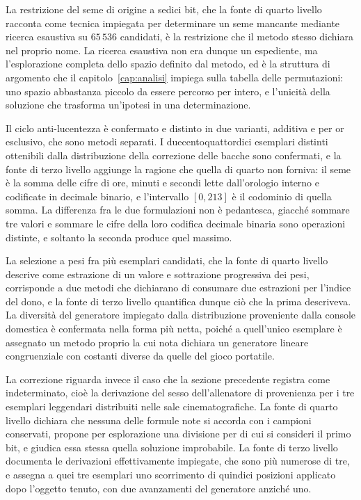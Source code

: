 La restrizione del seme di origine a sedici bit, che la fonte di quarto livello racconta come tecnica impiegata per determinare un seme mancante mediante ricerca esaustiva su $65\,536$ candidati, è la restrizione che il metodo stesso dichiara nel proprio nome. La ricerca esaustiva non era dunque un espediente, ma l'esplorazione completa dello spazio definito dal metodo, ed è la struttura di argomento che il capitolo~\ref{cap:analisi} impiega sulla tabella delle permutazioni: uno spazio abbastanza piccolo da essere percorso per intero, e l'unicità della soluzione che trasforma un'ipotesi in una determinazione.

Il ciclo anti-lucentezza è confermato e distinto in due varianti, additiva e per or esclusivo, che sono metodi separati. I duecentoquattordici esemplari distinti ottenibili dalla distribuzione della correzione delle bacche sono confermati, e la fonte di terzo livello aggiunge la ragione che quella di quarto non forniva: il seme è la somma delle cifre di ore, minuti e secondi lette dall'orologio interno e codificate in decimale binario, e l'intervallo $[0,213]$ è il codominio di quella somma. La differenza fra le due formulazioni non è pedantesca, giacché sommare tre valori e sommare le cifre della loro codifica decimale binaria sono operazioni distinte, e soltanto la seconda produce quel massimo.

La selezione a pesi fra più esemplari candidati, che la fonte di quarto livello descrive come estrazione di un valore e sottrazione progressiva dei pesi, corrisponde a due metodi che dichiarano di consumare due estrazioni per l'indice del dono, e la fonte di terzo livello quantifica dunque ciò che la prima descriveva. La diversità del generatore impiegato dalla distribuzione proveniente dalla console domestica è confermata nella forma più netta, poiché a quell'unico esemplare è assegnato un metodo proprio la cui nota dichiara un generatore lineare congruenziale con costanti diverse da quelle del gioco portatile.

La correzione riguarda invece il caso che la sezione precedente registra come indeterminato, cioè la derivazione del sesso dell'allenatore di provenienza per i tre esemplari leggendari distribuiti nelle sale cinematografiche. La fonte di quarto livello dichiara che nessuna delle formule note si accorda con i campioni conservati, propone per esplorazione una divisione per  di cui si consideri il primo bit, e giudica essa stessa quella soluzione improbabile. La fonte di terzo livello documenta le derivazioni effettivamente impiegate, che sono più numerose di tre, e assegna a quei tre esemplari uno scorrimento di quindici posizioni applicato dopo l'oggetto tenuto, con due avanzamenti del generatore anziché uno.

